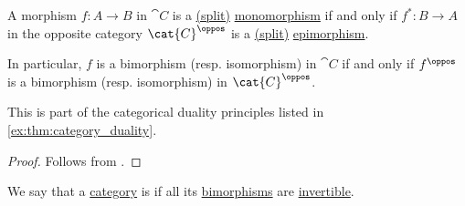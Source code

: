 \begin{proposition}\label{thm:morphism_invertibility_duality}
  A morphism \( f: A \to B \) in \( \cat{C} \) is a \hyperref[def:morphism_invertibility/left]{(split)} \hyperref[def:morphism_cancellation/left]{monomorphism} if and only if \( f^*: B \to A \) in the opposite category \( \cat{C}^\oppos \) is a \hyperref[def:morphism_invertibility/right]{(split)} \hyperref[def:morphism_cancellation/right]{epimorphism}.

  In particular, \( f \) is a bimorphism (resp. isomorphism) in \( \cat{C} \) if and only if \( f^\oppos \) is a bimorphism (resp. isomorphism) in \( \cat{C}^\oppos \).
\end{proposition}
\begin{comments}
  \item This is part of the categorical duality principles listed in \cref{ex:thm:category_duality}.
\end{comments}
\begin{proof}
  Follows from .
\end{proof}

\begin{definition}\label{def:balanced_category}
  We say that a \hyperref[def:category]{category} is  if all its \hyperref[def:morphism_cancellation/bimorphism]{bimorphisms} are \hyperref[def:morphism_invertibility/isomorphism]{invertible}.
\end{definition}


